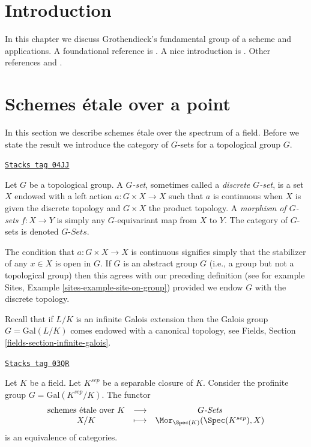 \section{Introduction}
\label{pione-section-introduction}
In this chapter we discuss Grothendieck's fundamental group of a scheme
and applications. A foundational reference is \cite{SGA1}.
A nice introduction is \cite{Lenstra}.
Other references \cite{Murre-lectures} and \cite{Grothendieck-Murre}.

\section{Schemes \'etale over a point}
\label{pione-section-schemes-etale-point}
In this section we describe schemes \'etale over the spectrum of a field.
Before we state the result we introduce the category of $G$-sets for a
topological group $G$.

\begin{definition}
\label{pione-definition-G-set-continuous}
\href{https://stacks.math.columbia.edu/tag/04JJ}{\texttt{Stacks tag 04JJ}}

Let $G$ be a topological group.
A {\it $G$-set}, sometimes called a {\it discrete $G$-set},
is a set $X$ endowed with a left action $a : G \times X \to X$
such that $a$ is continuous when $X$ is given the discrete topology and
$G \times X$ the product topology.
A {\it morphism of $G$-sets} $f : X \to Y$ is simply any $G$-equivariant
map from $X$ to $Y$.
The category of $G$-sets is denoted {\it $G\textit{-Sets}$}.
\end{definition}

The condition that $a : G \times X \to X$ is continuous signifies
simply that the stabilizer of any  $x \in X$ is open in $G$.
If $G$ is an abstract group $G$ (i.e., a group but not a topological group)
then this agrees with our preceding definition (see for example
Sites, Example \ref{sites-example-site-on-group})
provided we endow $G$ with the discrete topology.

\medskip\noindent
Recall that if $L/K$ is an infinite Galois extension then the
Galois group $G = \text{Gal}(L/K)$ comes endowed with a canonical
topology, see Fields, Section \ref{fields-section-infinite-galois}.

\begin{lemma}
\label{pione-lemma-sheaves-point}
\href{https://stacks.math.columbia.edu/tag/03QR}{\texttt{Stacks tag 03QR}}

Let $K$ be a field. Let $K^{sep}$ be a separable closure of $K$.
Consider the profinite group $G = \text{Gal}(K^{sep}/K)$.
The functor
$$
\begin{matrix}
\text{schemes \'etale over }K &
\longrightarrow &
G\textit{-Sets} \\
X/K & \longmapsto &
\Mor_{\Spec(K)}(\Spec(K^{sep}), X)
\end{matrix}
$$
is an equivalence of categories.
\end{lemma}

